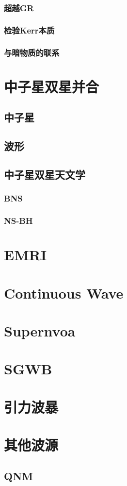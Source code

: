 \subsubsection{超越GR}
\subsubsection{检验Kerr本质}
\subsubsection{与暗物质的联系}
\section{中子星双星并合}
\subsection{中子星}
\subsection{波形}
\subsection{中子星双星天文学}
\subsubsection{BNS}
\subsubsection{NS-BH}
\section{EMRI}
\section{Continuous Wave}

\section{Supernvoa}
\section{SGWB}
\section{引力波暴}
\section{其他波源}
\subsection{QNM}

